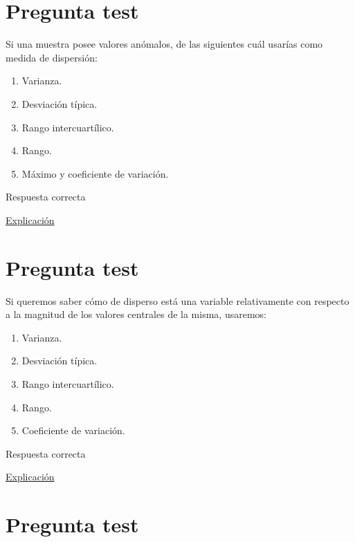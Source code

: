\documentclass[
]{book}
\providecommand{\tightlist}{%
  \setlength{\itemsep}{0pt}\setlength{\parskip}{0pt}}
\begin{document}
\hypertarget{pregunta-test-76}{%
\section{Pregunta test}\label{pregunta-test-76}}

Si una muestra posee valores anómalos, de las siguientes cuál usarías como medida de dispersión:

\begin{enumerate}
\def\labelenumi{\alph{enumi})}
\tightlist
\item
  Varianza.
\item
  Desviación típica.
\item
  Rango intercuartílico.
\item
  Rango.
\item
  Máximo y coeficiente de variación.
\end{enumerate}

Respuesta correcta

\href{https://1fjmanzano.github.io/bioestadistica/medidas-de-posicio\%CC\%81n-dispersio\%CC\%81n-y-forma.html\#medidas-de-dispersio\%CC\%81n}{Explicación}

\hypertarget{pregunta-test-77}{%
\section{Pregunta test}\label{pregunta-test-77}}

Si queremos saber cómo de disperso está una variable relativamente con respecto a la magnitud de los valores centrales de la misma, usaremos:

\begin{enumerate}
\def\labelenumi{\alph{enumi})}
\tightlist
\item
  Varianza.
\item
  Desviación típica.
\item
  Rango intercuartílico.
\item
  Rango.
\item
  Coeficiente de variación.
\end{enumerate}

Respuesta correcta

\href{https://en.wikipedia.org/wiki/Coefficient_of_variation}{Explicación}

\hypertarget{pregunta-test-78}{%
\section{Pregunta test}\label{pregunta-test-78}}
\end{document}
